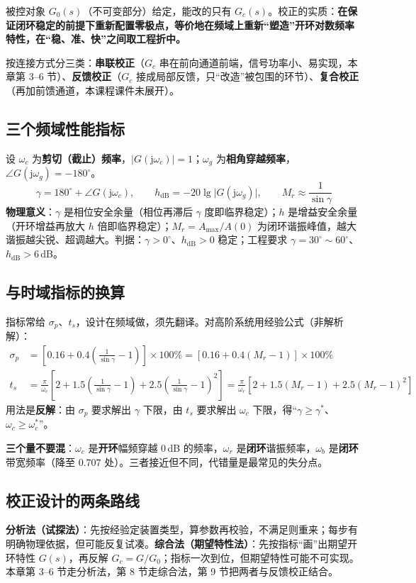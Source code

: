 被控对象 $G_0(s)$（不可变部分）给定，能改的只有 $G_c(s)$。校正的实质：\textbf{在保证闭环稳定的前提下重新配置零极点，等价地在频域上重新“塑造”开环对数频率特性，在“稳、准、快”之间取工程折中。}

按连接方式分三类：\textbf{串联校正}（$G_c$ 串在前向通道前端，信号功率小、易实现，本章第 3--6 节）、\textbf{反馈校正}（$G_c$ 接成局部反馈，只“改造”被包围的环节）、\textbf{复合校正}（再加前馈通道，本课程课件未展开）。

\subsection{三个频域性能指标}
设 $\omega_c$ 为\textbf{剪切（截止）频率}，$|G(\mathrm{j}\omega_c)|=1$；$\omega_g$ 为\textbf{相角穿越频率}，$\angle G(\mathrm{j}\omega_g)=-180^\circ$。
\[
\gamma=180^\circ+\angle G(\mathrm{j}\omega_c),\qquad
h_{\mathrm{dB}}=-20\lg\bigl|G(\mathrm{j}\omega_g)\bigr|,\qquad
M_r\approx\frac{1}{\sin\gamma}
\]
\textbf{物理意义}：$\gamma$ 是相位安全余量（相位再滞后 $\gamma$ 度即临界稳定）；$h$ 是增益安全余量（开环增益再放大 $h$ 倍即临界稳定）；$M_r=A_{\max}/A(0)$ 为闭环谐振峰值，越大谐振越尖锐、超调越大。判据：$\gamma>0^\circ$、$h_{\mathrm{dB}}>0$ 稳定；工程要求 $\gamma=30^\circ\sim60^\circ$、$h_{\mathrm{dB}}>6$\,dB。

\subsection{与时域指标的换算}
指标常给 $\sigma_p$、$t_s$，设计在频域做，须先翻译。对高阶系统用经验公式（非解析解）：
\begin{align}
\sigma_p&=\left[0.16+0.4\left(\frac{1}{\sin\gamma}-1\right)\right]\times100\%
=\left[0.16+0.4\left(M_r-1\right)\right]\times100\%\\
t_s&=\frac{\pi}{\omega_c}\left[2+1.5\left(\frac{1}{\sin\gamma}-1\right)+2.5\left(\frac{1}{\sin\gamma}-1\right)^{2}\right]
=\frac{\pi}{\omega_r}\left[2+1.5\left(M_r-1\right)+2.5\left(M_r-1\right)^{2}\right]
\end{align}
用法是\textbf{反解}：由 $\sigma_p$ 要求解出 $\gamma$ 下限，由 $t_s$ 要求解出 $\omega_c$ 下限，得“$\gamma\ge\gamma^*$、$\omega_c\ge\omega_c^*$”。

\noindent\textbf{三个量不要混}：$\omega_c$ 是\textbf{开环}幅频穿越 $0$\,dB 的频率，$\omega_r$ 是\textbf{闭环}谐振频率，$\omega_b$ 是\textbf{闭环}带宽频率（降至 $0.707$ 处）。三者接近但不同，代错量是最常见的失分点。

\subsection{校正设计的两条路线}
\textbf{分析法（试探法）}：先按经验定装置类型，算参数再校验，不满足则重来；每步有明确物理依据，但可能反复试凑。\textbf{综合法（期望特性法）}：先按指标“画”出期望开环特性 $G(s)$，再反解 $G_c=G/G_0$；指标一次到位，但期望特性可能不可实现。本章第 3--6 节走分析法，第 8 节走综合法，第 9 节把两者与反馈校正结合。

